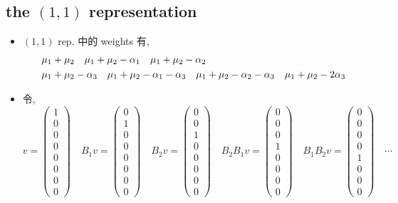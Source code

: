 \subsection{the \texorpdfstring{$(1, 1)$}{(1, 1)} representation}
\begin{itemize}
	\item $(1, 1)$ rep. 中的 weights 有,
	\begin{align}
		& \mu_1 + \mu_2 \quad \mu_1 + \mu_2 - \alpha_1 \quad \mu_1 + \mu_2 - \alpha_2 \notag \\
		& \mu_1 + \mu_2 - \alpha_3 \quad \mu_1 + \mu_2 - \alpha_1 - \alpha_3 \quad \mu_1 + \mu_2 - \alpha_2 - \alpha_3 \quad \mu_1 + \mu_2 - 2 \alpha_3
	\end{align}
	
	\item 令,
	\begin{equation}
		v = \begin{pmatrix}
			1 \\
			0 \\
			0 \\
			0 \\
			0 \\
			0 \\
			0 \\
			0
		\end{pmatrix} \quad B_1 v = \begin{pmatrix}
			0 \\
			1 \\
			0 \\
			0 \\
			0 \\
			0 \\
			0 \\
			0
		\end{pmatrix} \quad B_2 v = \begin{pmatrix}
			0 \\
			0 \\
			1 \\
			0 \\
			0 \\
			0 \\
			0 \\
			0
		\end{pmatrix} \quad B_2 B_1 v = \begin{pmatrix}
			0 \\
			0 \\
			0 \\
			1 \\
			0 \\
			0 \\
			0 \\
			0
		\end{pmatrix} \quad B_1 B_2 v = \begin{pmatrix}
			0 \\
			0 \\
			0 \\
			0 \\
			1 \\
			0 \\
			0 \\
			0
		\end{pmatrix} \quad \cdots
	\end{equation}
	

\end{itemize}
